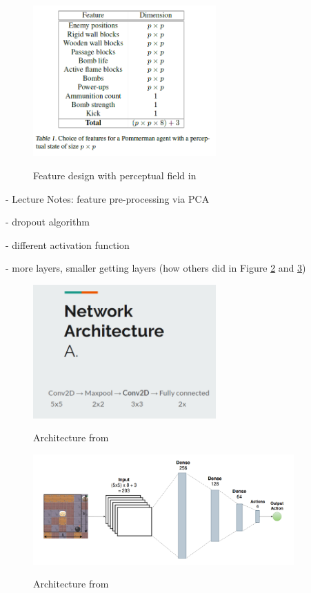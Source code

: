 \documentclass[a4paper ,12pt]{report}
\begin{document}
	\begin{figure}[ht]
		\caption{Feature design with perceptual field in \cite{Pommerman}}
		\includegraphics[width=7cm]{features_with_perceptual_field.png}
		\label{fig:feat1}
	\end{figure}
	
	- Lecture Notes: feature pre-processing via PCA
	
	- dropout algorithm 
	
	- different activation function
	
	- more layers, smaller getting layers (how others did in Figure \ref{fig:arch1} and \ref{fig:arch2})
	
	\begin{figure}[ht]
		\caption{Architecture from \cite{AlanPresentation}}
		\includegraphics[width=7cm]{architecture.png}
		\label{fig:arch1}
	\end{figure}

	\begin{figure}[ht]
		\caption{Architecture from \cite{Pommerman}}
		\includegraphics[width=10cm]{architecture_2.png}
		\label{fig:arch2}
	\end{figure}
	
\end{document}
